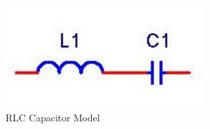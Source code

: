\begin{figure}[ht!]
\includegraphics[keepaspectratio=true,width=3in]{./figures/parameters/RLCModel.jpg}
\centering
\caption{RLC Capacitor Model}
\label{fig:RLCModel}
\end{figure}
